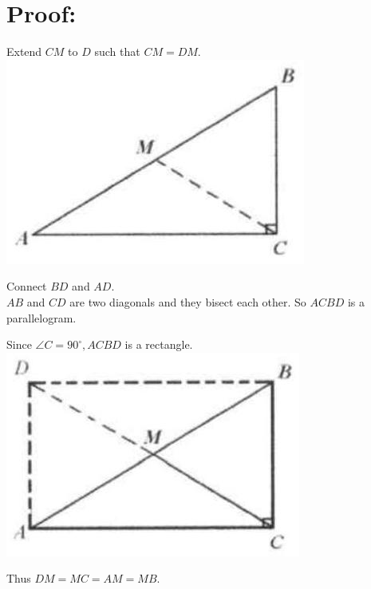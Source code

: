 \documentclass[10pt]{article}
\begin{document}
\section*{Proof:}
Extend \(C M\) to \(D\) such that \(C M=D M\).\\
\includegraphics[max width=\textwidth, center]{2025_04_17_97bc1f7e44d93c271a88g-024(2)}

Connect \(B D\) and \(A D\).\\
\(A B\) and \(C D\) are two diagonals and they bisect each other. So \(A C B D\) is a parallelogram.

Since \(\angle C=90^{\circ}, A C B D\) is a rectangle.\\
\includegraphics[max width=\textwidth, center]{2025_04_17_97bc1f7e44d93c271a88g-024(1)}

Thus \(D M=M C=A M=M B\).
\end{document}
